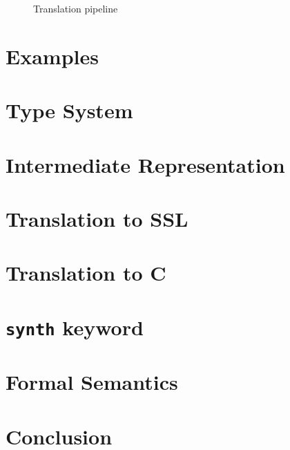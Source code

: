 \documentclass[runningheads]{llncs}
\begin{document}
\begin{figure}
  
  \caption{Translation pipeline}
  \label{fig:pipeline}
\end{figure}

\section{Examples}
\label{sec:examples}


\section{Type System}
\label{sec:types}

\section{Intermediate Representation}
\label{sec:IR}

\section{Translation to SSL}
\label{sec:to-ssl}

\section{Translation to C}
\label{sec:to-c}

\section{\texttt{synth} keyword}
\label{sec:synth}

\section{Formal Semantics}
\label{sec:semantics}

\section{Conclusion}
\label{sec:conclusion}

% 
% 
% 
% 
% 
% 
% 



\end{document}
